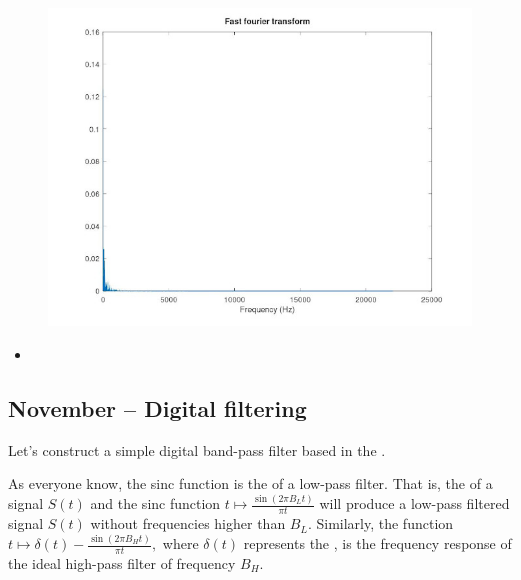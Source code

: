 \documentclass{article}
\begin{document}
\begin{figure}
  \includegraphics[width=\linewidth]{tappimarssi.jpg}
\end{figure}


\begin{itemize}
\item  {}
\end{itemize}

\subsection{November – Digital filtering}

Let's construct a simple digital band-pass filter based in the .

As everyone know, the sinc function is the  of a low-pass filter. That is, the  of a signal $ S(t)$ and the sinc function $ t \mapsto \frac{\sin(2 \pi B_L t)}{\pi t}$ will produce a low-pass filtered signal $S(t)$ without frequencies higher than $B_L$. Similarly, the function $ t \mapsto \delta(t) -  \frac{\sin(2 \pi B_H t)}{\pi t},$ where $ \delta(t)$ represents the , is the frequency response of the ideal high-pass filter of frequency $B_H$.
\end{document}
